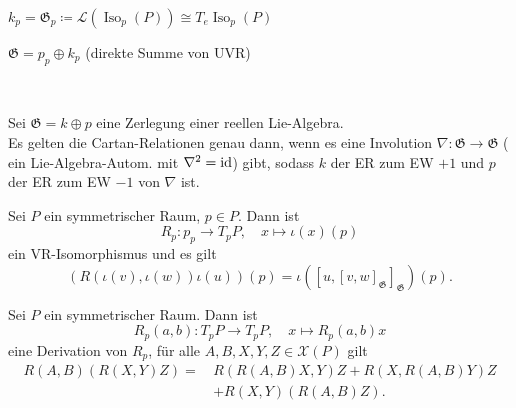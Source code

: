 \documentclass{cheat-sheet}
\DeclareMathOperator{\Iso}{Iso} %
\newcommand{\Gie}{\mathfrak{G}} %
\newcommand{\VF}{\mathcal{X}} %
\begin{document}

\begin{prop}
  $k_p = \mathfrak{G}_p \coloneqq \mathcal{L}(\Iso_p(P)) \cong T_e \Iso_p(P)$
\end{prop}

\iffalse
\begin{lem}
  $p_p \cap k_p = \{ 0 \}$
\end{lem}
\fi

\begin{prop}
  $\Gie = p_p \oplus k_p$ (direkte Summe von UVR)
\end{prop}

\begin{prop}\mbox{}\\
  \inlineitem{$[k_p, k_p]_\Gie \subseteq k_p$} \quad
  \inlineitem{$[k_p, p_p]_\Gie \subseteq p_p$} \quad
  \inlineitem{$[p_p, p_p]_\Gie \subseteq k_p$}
\end{prop}

\begin{prop}
  Sei $\Gie = k \oplus p$ eine Zerlegung einer reellen Lie-Algebra. \\
  Es gelten die Cartan-Relationen genau dann, wenn es eine Involution $\nabla : \Gie \to \Gie$ (\dh{} ein Lie-Algebra-Autom. mit $\nabla^2 = \operatorname{id}$) gibt, sodass $k$ der ER zum EW $+1$ und $p$ der ER zum EW $-1$ von $\nabla$ ist.
\end{prop}

\begin{prop}
  Sei $P$ ein symmetrischer Raum, $p \in P$. Dann ist
  \[
    R_p : p_p \to T_p P, \quad
    x \mapsto \iota(x)(p)
  \]
  ein VR-Isomorphismus und es gilt
  \[ (R(\iota(v), \iota(w)) \iota(u))(p) = \iota([u, [v, w]_\Gie]_\Gie)(p). \]
\end{prop}

\begin{kor}
  Sei $P$ ein symmetrischer Raum. Dann ist
  \[
    R_p(a, b) : T_p P \to T_p P, \quad
    x \mapsto R_p(a, b) x
  \]
  eine Derivation von $R_p$, \dh{} für alle $A, B, X, Y, Z \in \VF(P)$ gilt
  \begin{align*}
    R(A, B)(R(X, Y)Z) = \, & R(R(A, B)X, Y)Z + R(X, R(A, B)Y)Z \\
    & + R(X, Y)(R(A, B)Z).
  \end{align*}
\end{kor}

\end{document}

